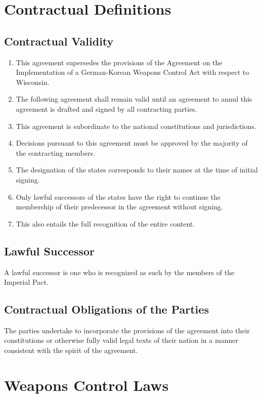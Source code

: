 \documentclass{article}
\begin{document}
\section{Contractual Definitions}

\subsection{Contractual Validity}
\begin{enumerate}[(1)]
    \item This agreement supersedes the provisions of the Agreement on the Implementation of a German-Korean Weapons Control Act with respect to Wisconsin.
    \item The following agreement shall remain valid until an agreement to annul this agreement is drafted and signed by all contracting parties.
    \item This agreement is subordinate to the national constitutions and jurisdictions.
    \item Decisions pursuant to this agreement must be approved by the majority of the contracting members.
    \item The designation of the states corresponds to their names at the time of initial signing.
    \item Only lawful successors of the states have the right to continue the membership of their predecessor in the agreement without signing.
    \item This also entails the full recognition of the entire content.
\end{enumerate}

\subsection{Lawful Successor}
A lawful successor is one who is recognized as such by the members of the Imperial Pact.

\subsection{Contractual Obligations of the Parties}
The parties undertake to incorporate the provisions of the agreement into their constitutions or otherwise fully valid legal texts of their nation in a manner consistent with the spirit of the agreement.

\section{Weapons Control Laws}
\end{document}

